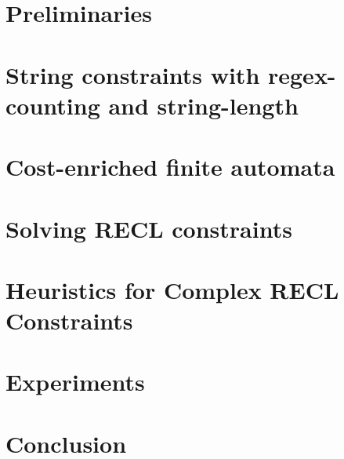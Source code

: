 \documentclass[runningheads]{llncs}
\begin{document}
\section{Preliminaries} \label{sec:pre}


\section{String constraints with regex-counting and string-length}\label{sec:recl}


\section{Cost-enriched finite automata} \label{sec:automaton}


\section{Solving RECL constraints} \label{sec:algorithm}


\section{Heuristics for Complex RECL Constraints} \label{sec:heuristic}


\section{Experiments} \label{sec:implementation}


\section{Conclusion} \label{sec:conclu}


\newpage




%
\end{document}
